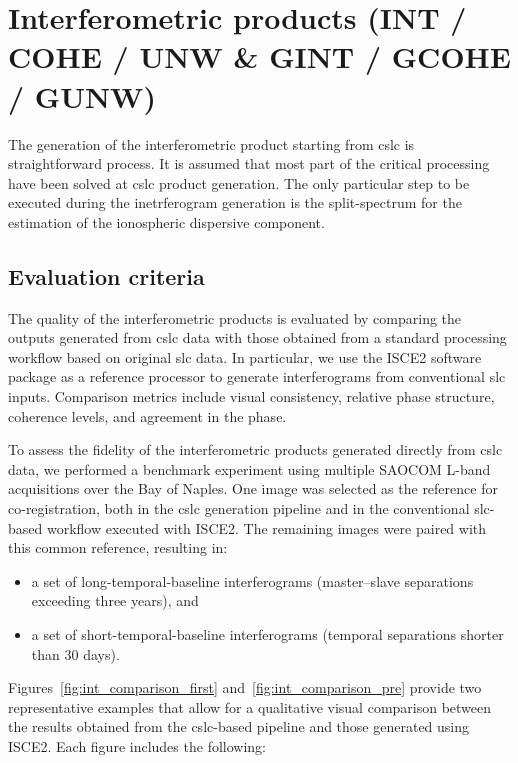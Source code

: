 \section{Interferometric products (INT / COHE / UNW \& GINT / GCOHE / GUNW)}
\label{sec:int}

The generation of the interferometric product starting from \acs{cslc} is straightforward process. It is assumed that most part of the critical processing have been solved at \acs{cslc} product generation. The only particular step to be executed during the inetrferogram generation is the split-spectrum for the estimation of the ionospheric dispersive component.

\subsection{Evaluation criteria}

\label{sec:int_criteria}

The quality of the interferometric products is evaluated by comparing the outputs generated from \acs{cslc} data with those obtained from a standard processing workflow based on original \acs{slc} data. In particular, we use the ISCE2 software package as a reference processor to generate interferograms from conventional \acs{slc} inputs. Comparison metrics include visual consistency, relative phase structure, coherence levels, and agreement in the phase. 

To assess the fidelity of the interferometric products generated directly from \acs{cslc} data, we performed a benchmark experiment using multiple SAOCOM L-band acquisitions over the Bay of Naples. One image was selected as the reference for co-registration, both in the \acs{cslc} generation pipeline and in the conventional \acs{slc}-based workflow executed with ISCE2. The remaining images were paired with this common reference, resulting in:

\begin{itemize}
  \item a set of long-temporal-baseline interferograms (master–slave separations exceeding three years), and
  \item a set of short-temporal-baseline interferograms (temporal separations shorter than 30 days).
\end{itemize}

Figures~\ref{fig:int_comparison_first} and~\ref{fig:int_comparison_pre} provide two representative examples that allow for a qualitative visual comparison between the results obtained from the \acs{cslc}-based pipeline and those generated using ISCE2. Each figure includes the following:

